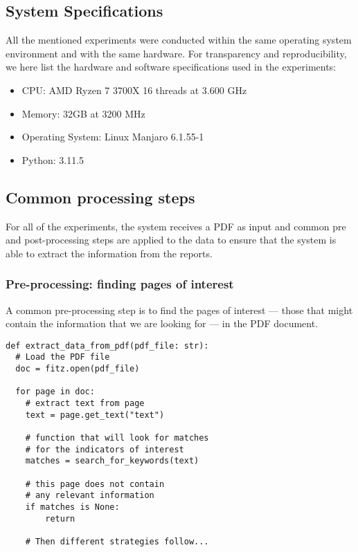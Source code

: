 \documentclass[english, 12pt, a4paper, elec, utf8, a-2b, online]{aaltothesis}
\begin{document}
\subsection{System Specifications}

All the mentioned experiments were conducted within the same operating system environment and with the same hardware.
For transparency and reproducibility, we here list the hardware and software specifications used in the experiments:

\begin{itemize}
    \item CPU: AMD Ryzen 7 3700X 16 threads at 3.600 GHz
    \item Memory: 32GB at 3200 MHz
    \item Operating System: Linux Manjaro 6.1.55-1
    \item Python: 3.11.5
\end{itemize}

\subsection{Common processing steps}

For all of the experiments, the system receives a \ac{PDF} as input and common pre and post-processing steps are applied to the data to ensure that the system is able to extract the information from the reports.

\subsubsection{Pre-processing: finding pages of interest}

A common pre-processing step is to find the pages of interest --- those that might contain the information that we are looking for --- in the \ac{PDF} document.

\begin{verbatim}
def extract_data_from_pdf(pdf_file: str):
  # Load the PDF file
  doc = fitz.open(pdf_file)

  for page in doc:
    # extract text from page
    text = page.get_text("text")

    # function that will look for matches
    # for the indicators of interest
    matches = search_for_keywords(text)

    # this page does not contain
    # any relevant information
    if matches is None:
        return

    # Then different strategies follow...
\end{verbatim}
\end{document}

